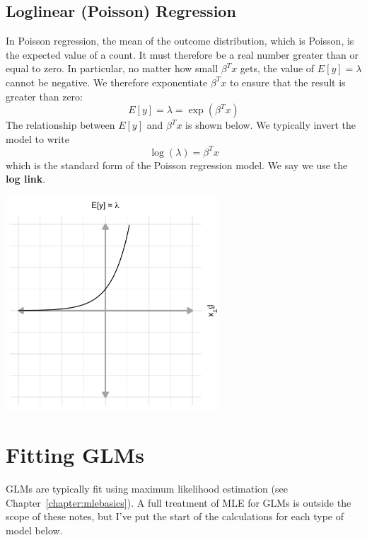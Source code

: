 \subsection{Loglinear (Poisson) Regression}

In Poisson regression, the mean of the outcome distribution, which is Poisson, is the expected value of a count. It must therefore be a real number greater than or equal to zero. In particular, no matter how small $\beta^T x$ gets, the value of $E[y] = \lambda$ cannot be negative. We therefore exponentiate $\beta^T x$ to ensure that the result is greater than zero:
\begin{equation} E[y] = \lambda = \exp(\beta^T x) \label{eqn:meanpoisson} \end{equation}
The relationship between $E[y]$ and $\beta^T x$ is shown below. We typically invert the model to write
$$ \log(\lambda) = \beta^T x $$
which is the standard form of the Poisson regression model. We say we use the \textbf{log link}. 

\begin{center}
\includegraphics[width=0.6\textwidth]{img/l02-figure3-poisson.png}
\end{center}


\section{Fitting GLMs}

GLMs are typically fit using maximum likelihood estimation (see Chapter~\ref{chapter:mlebasics}). A full treatment of MLE for GLMs is outside the scope of these notes, but I've put the start of the calculations for each type of model below.    

